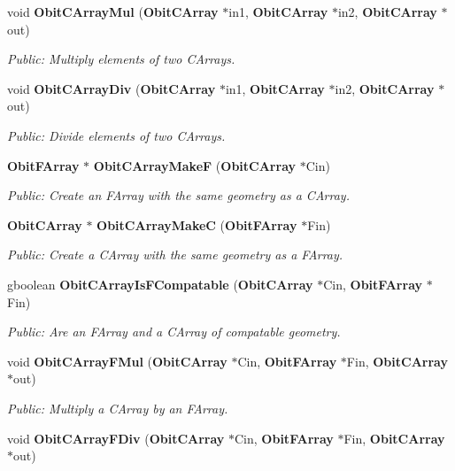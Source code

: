 \begin{CompactItemize}
void {\bf Obit\-CArray\-Mul} ({\bf Obit\-CArray} $\ast$in1, {\bf Obit\-CArray} $\ast$in2, {\bf Obit\-CArray} $\ast$out)
\begin{CompactList}\small\item\em Public: Multiply elements of two CArrays. \item\end{CompactList}\item 
void {\bf Obit\-CArray\-Div} ({\bf Obit\-CArray} $\ast$in1, {\bf Obit\-CArray} $\ast$in2, {\bf Obit\-CArray} $\ast$out)
\begin{CompactList}\small\item\em Public: Divide elements of two CArrays. \item\end{CompactList}\item 
{\bf Obit\-FArray} $\ast$ {\bf Obit\-CArray\-Make\-F} ({\bf Obit\-CArray} $\ast$Cin)
\begin{CompactList}\small\item\em Public: Create an FArray with the same geometry as a CArray. \item\end{CompactList}\item 
{\bf Obit\-CArray} $\ast$ {\bf Obit\-CArray\-Make\-C} ({\bf Obit\-FArray} $\ast$Fin)
\begin{CompactList}\small\item\em Public: Create a CArray with the same geometry as a FArray. \item\end{CompactList}\item 
gboolean {\bf Obit\-CArray\-Is\-FCompatable} ({\bf Obit\-CArray} $\ast$Cin, {\bf Obit\-FArray} $\ast$Fin)
\begin{CompactList}\small\item\em Public: Are an FArray and a CArray of compatable geometry. \item\end{CompactList}\item 
void {\bf Obit\-CArray\-FMul} ({\bf Obit\-CArray} $\ast$Cin, {\bf Obit\-FArray} $\ast$Fin, {\bf Obit\-CArray} $\ast$out)
\begin{CompactList}\small\item\em Public: Multiply a CArray by an FArray. \item\end{CompactList}\item 
void {\bf Obit\-CArray\-FDiv} ({\bf Obit\-CArray} $\ast$Cin, {\bf Obit\-FArray} $\ast$Fin, {\bf Obit\-CArray} $\ast$out)

\end{CompactItemize}
